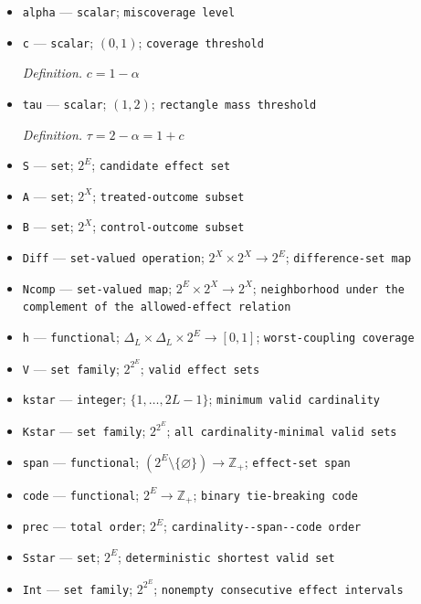 \documentclass{article}
\begin{document}
\begin{itemize}
  \item \texttt{alpha} --- \texttt{scalar}; \texttt{miscoverage level}
  \item \texttt{c} --- \texttt{scalar}; \((0,1)\); \texttt{coverage threshold}
  \par\smallskip\noindent\emph{Definition.} \(c=1-\alpha\)
  \item \texttt{tau} --- \texttt{scalar}; \((1,2)\); \texttt{rectangle mass threshold}
  \par\smallskip\noindent\emph{Definition.} \(\tau=2-\alpha=1+c\)
  \item \texttt{S} --- \texttt{set}; \(2^E\); \texttt{candidate effect set}
  \item \texttt{A} --- \texttt{set}; \(2^X\); \texttt{treated-\allowbreak{}outcome subset}
  \item \texttt{B} --- \texttt{set}; \(2^X\); \texttt{control-\allowbreak{}outcome subset}
  \item \texttt{Diff} --- \texttt{set-\allowbreak{}valued operation}; \(2^X\times2^X\to2^E\); \texttt{difference-\allowbreak{}set map}
  \item \texttt{Ncomp} --- \texttt{set-\allowbreak{}valued map}; \(2^E\times2^X\to2^X\); \texttt{neighborhood under the complement of the allowed-\allowbreak{}effect relation}
  \item \texttt{h} --- \texttt{functional}; \(\Delta_L\times\Delta_L\times2^E\to[0,1]\); \texttt{worst-\allowbreak{}coupling coverage}
  \item \texttt{V} --- \texttt{set family}; \(2^{2^E}\); \texttt{valid effect sets}
  \item \texttt{kstar} --- \texttt{integer}; \(\{1,\ldots,2L-1\}\); \texttt{minimum valid cardinality}
  \item \texttt{Kstar} --- \texttt{set family}; \(2^{2^E}\); \texttt{all cardinality-\allowbreak{}minimal valid sets}
  \item \texttt{span} --- \texttt{functional}; \((2^E\setminus\{\varnothing\})\to\mathbb Z_{+}\); \texttt{effect-\allowbreak{}set span}
  \item \texttt{code} --- \texttt{functional}; \(2^E\to\mathbb Z_{+}\); \texttt{binary tie-\allowbreak{}breaking code}
  \item \texttt{prec} --- \texttt{total order}; \(2^E\); \texttt{cardinality-\allowbreak{}-\allowbreak{}span-\allowbreak{}-\allowbreak{}code order}
  \item \texttt{Sstar} --- \texttt{set}; \(2^E\); \texttt{deterministic shortest valid set}
  \item \texttt{Int} --- \texttt{set family}; \(2^{2^E}\); \texttt{nonempty consecutive effect intervals}

\end{itemize}
\end{document}
